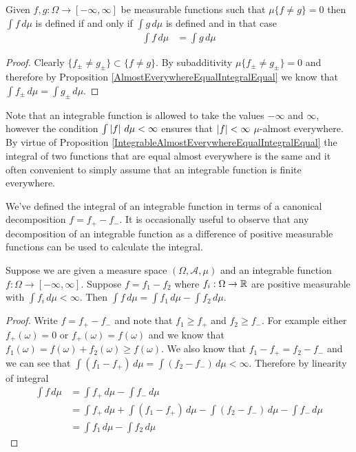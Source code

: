 \begin{prop}\label{IntegrableAlmostEverywhereEqualIntegralEqual}Given $f,g : \Omega \to [-\infty, \infty]$ be measurable functions such that $\mu \lbrace f \neq g \rbrace = 0$ then $\int f \, d\mu$ is defined if and only if $\int g \, d\mu$ is defined and in that case
\begin{align*}
\int f \, d\mu &= \int g \, d\mu
\end{align*}
\end{prop}
\begin{proof}
Clearly $\lbrace f_\pm \neq g_\pm \rbrace \subset \lbrace f \neq g \rbrace$.  By subadditivity $\mu \lbrace f_\pm \neq g_\pm \rbrace = 0$ and therefore by Proposition \ref{AlmostEverywhereEqualIntegralEqual} we know that $\int f_\pm \, d\mu = \int g_\pm \, d\mu$.
\end{proof}
 
Note that an integrable function is allowed to take the values $-\infty$ and $\infty$,
however the condition $\int \left \vert f \right \vert \, d\mu<\infty$ ensures that $\left \vert f \right \vert < \infty$ $\mu$-almost everywhere.
By virtue of Proposition \ref{IntegrableAlmostEverywhereEqualIntegralEqual} the integral of two functions that are equal almost everywhere is the same and it often
convenient to simply assume that an integrable function is finite everywhere.

We've defined the integral of an integrable function in terms of a
canonical decomposition $f = f_+ - f_-$.  It is occasionally useful to
observe that any decomposition of an integrable function as a
difference of positive measurable functions can be used to calculate
the integral.
\begin{lem}Suppose we are given a measure space $(\Omega, \mathcal{A},
  \mu)$ and an integrable function $f : \Omega \to [-\infty, \infty]$.  Suppose
  $f = f_1 -f_2$ where $f_i  : \Omega \to \mathbb{R}$ are positive measurable
  with $\int f_i \, d \mu < \infty$. Then $\int f \, d\mu = \int f_1 \,
  d\mu - \int f_2 \, d\mu$.
\end{lem}
\begin{proof}Write $f = f_+ - f_-$ and note that $f_1 \geq f_+$ and
  $f_2 \geq f_-$.  For example either $f_+(\omega) = 0$ or
  $f_+(\omega) = f(\omega)$ and we know that $f_1(\omega) = f(\omega)
  + f_2(\omega) \geq f(\omega)$.  We also know that $f_1 - f_+ = f_2 -
  f_-$ and we can see that $\int (f_1 - f_+) \, d\mu = \int (f_2 - f_-) \, d\mu 
  < \infty$.  Therefore by
  linearity of integral
\begin{align*}
\int f \, d\mu &= \int f_+ \, d\mu - \int  f_- \, d\mu \\
&= \int f_+ \, d\mu + \int (f_1 - f_+) \, d\mu - \int (f_2 - f_-) \,
d\mu - \int  f_- \, d\mu \\
&= \int f_1 \, d\mu - \int  f_2 \, d\mu
\end{align*}
\end{proof}

